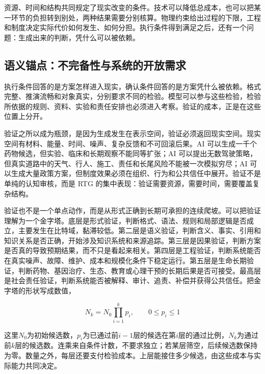 资源、时间和结构共同规定了现实改变的条件。技术可以降低总成本，也可以把某一环节的负担转到别处，两种结果需要分别核算。物理约束给出过程的下限，工程和制度决定实际代价如何发生、如何分担。执行条件得到满足之后，还有一个问题：生成出来的判断，凭什么可以被依赖。

\subsection{语义锚点：不完备性与系统的开放需求}

执行条件回答的是方案怎样进入现实，确认条件回答的是方案凭什么被依赖。格式完整、推演流畅和对象真实，分别要求不同的检验。模型可以参与这些检验，检验所依据的规则、资料、实验和责任安排也必须进入考察。验证的成本，正是在这些位置上分开。


验证之所以成为瓶颈，是因为生成发生在表示空间，验证必须返回现实空间。现实空间有材料、能量、时间、噪声、复杂反馈和不可回滚后果。AI 可以生成一千个药物候选，但实验、临床和长期观察不能同等扩张；AI 可以提出无数驾驶策略，但真实道路中的天气、行人、施工、责任和长尾风险不能被一次模拟穷尽；AI 可以生成大量政策方案，但制度效果必须在组织、行为和公共信任中展开。验证不是单纯的认知审核，而是 RTG 的集中表现：验证需要资源，需要时间，需要覆盖复杂结构。

验证也不是一个单点动作，而是从形式正确到长期可承担的连续爬坡。可以把验证理解为一个金字塔。底层是形式验证，判断格式、语法、规则和局部逻辑是否成立，主要发生在比特域，黏滞较低。第二层是语义验证，判断含义、事实、引用和知识关系是否正确，开始涉及知识系统和来源追踪。第三层是因果验证，判断方案是否真的导致预期结果，而不只是看起来相关。第四层是工程验证，判断系统能否在真实噪声、故障、维护、成本和规模化条件下稳定运行。第五层是生命长期验证，判断药物、基因治疗、生态、教育或心理干预的长期后果是否可接受。最高层是社会责任验证，判断系统能否被解释、审计、追责、补偿并获得公共信任。把金字塔的形状写成数值，

\begin{equation}
N_{k}=N_{0}\prod_{i=1}^{k}p_{i},
\qquad
0\le p_{i}\le 1
\end{equation}

这里$N_0$为初始候选数，$p_i$为已通过前$i-1$层的候选在第$i$层的通过比例，$N_k$为通过前$k$层的候选数。连乘来自条件计数，不要求独立；若某层筛空，后续候选数保持为零。数量之外，每层还要支付检验成本。上层能接住多少候选，由这些成本与实际能力共同决定。


